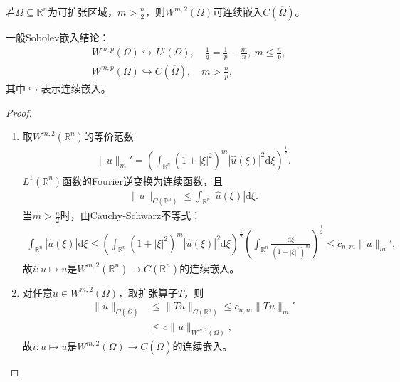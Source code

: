 \documentclass[../../main.tex]{subfiles}%
\begin{document}
\begin{theorem}[Sobolev嵌入定理]\label{theorem:泛函分析--Sobolev嵌入定理}
若$\Omega\subseteq\mathbb{R}^{n}$为可扩张区域，$m>\frac{n}{2}$，则$W^{m,2}(\Omega)$可连续嵌入$C(\overline{\Omega})$。
\end{theorem}
\begin{remark}
一般Sobolev嵌入结论：
\begin{align*}
&W^{m,p}(\Omega)\hookrightarrow L^{q}(\Omega),\quad \frac{1}{q}=\frac{1}{p}-\frac{m}{n},\ m\leqslant\frac{n}{p},\\
&W^{m,p}(\Omega)\hookrightarrow C(\overline{\Omega}),\quad m>\frac{n}{p},
\end{align*}
其中$\hookrightarrow$表示连续嵌入。
\end{remark}
\begin{proof}
\begin{enumerate}[(1)]
\item 取$W^{m,2}(\mathbb{R}^{n})$的等价范数
\begin{align*}
\|u\|_{m}'=\left(\int_{\mathbb{R}^{n}}(1+|\xi|^{2})^{m}|\widehat{u}(\xi)|^{2}\mathrm{d}\xi\right)^{\frac{1}{2}}.
\end{align*}
$L^{1}(\mathbb{R}^{n})$函数的Fourier逆变换为连续函数，且
\begin{align*}
\|u\|_{C(\mathbb{R}^{n})}\leqslant\int_{\mathbb{R}^{n}}|\widehat{u}(\xi)|\mathrm{d}\xi.
\end{align*}
当$m>\frac{n}{2}$时，由Cauchy‑Schwarz不等式：
\begin{align*}
\int_{\mathbb{R}^{n}}|\widehat{u}(\xi)|\mathrm{d}\xi\leqslant\left(\int_{\mathbb{R}^{n}}(1+|\xi|^{2})^{m}|\widehat{u}(\xi)|^{2}\mathrm{d}\xi\right)^{\frac{1}{2}}\left(\int_{\mathbb{R}^{n}}\frac{\mathrm{d}\xi}{(1+|\xi|^{2})^{m}}\right)^{\frac{1}{2}}
\leqslant c_{n,m}\|u\|_{m}',
\end{align*}
故$i:u\mapsto u$是$W^{m,2}(\mathbb{R}^{n})\to C(\mathbb{R}^{n})$的连续嵌入。
\item 对任意$u\in W^{m,2}(\Omega)$，取扩张算子$T$，则
\begin{align*}
\|u\|_{C(\overline{\Omega})}&\leqslant\|Tu\|_{C(\mathbb{R}^{n})}\leqslant c_{n,m}\|Tu\|_{m}'\\
&\leqslant c\|u\|_{W^{m,2}(\Omega)},
\end{align*}
故$i:u\mapsto u$是$W^{m,2}(\Omega)\to C(\overline{\Omega})$的连续嵌入。
\end{enumerate}

\end{proof}
\end{document}
